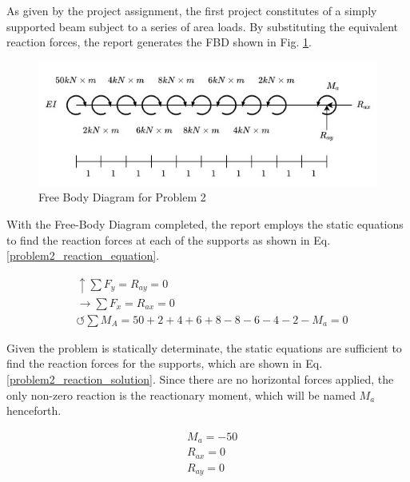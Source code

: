 \documentclass[a4paper]{article}
\begin{document}
As given by the project assignment, the first project constitutes of a simply supported beam subject to a series of area loads. By substituting the equivalent reaction forces, the report generates the FBD shown in Fig. \ref{FBD_2}.

\begin{figure}[h]
\includegraphics[width=\textwidth]{FBD/FBD_2.jpg}
\caption{Free Body Diagram for Problem 2}
\label{FBD_2}
\end{figure}

With the Free-Body Diagram completed, the report employs the static equations to find the reaction forces at each of the supports as shown in Eq. \ref{problem2_reaction_equation}.

\begin{equation}
\begin{split}
	&\uparrow \sum F_y = R_{ay} = 0 \\
 	&\rightarrow \sum F_x = R_{ax} = 0 \\
 	&\circlearrowleft \sum M_A = 50 + 2 + 4 + 6 + 8 - 8 - 6 - 4 - 2 - M_a = 0
\end{split}
\label{problem2_reaction_equation}
\end{equation}

Given the problem is statically determinate, the static equations are sufficient to find the reaction forces for the supports, which are shown in Eq. \ref{problem2_reaction_solution}. Since there are no horizontal forces applied, the only non-zero reaction is the reactionary moment, which will be named $M_a$ henceforth.

\begin{equation}
\begin{split}
	& M_a = -50 \\
	& R_{ax} = 0 \\
	& R_{ay} = 0 \\
\end{split}
\label{problem2_reaction_solution}
\end{equation}
\end{document}
